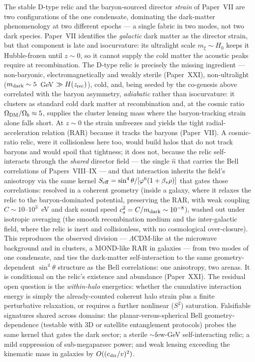 The stable D-type relic and the baryon-sourced director \emph{strain}
of Paper~VII are two configurations of the one condensate, dominating
the dark-matter phenomenology at two different epochs --- a single
fabric in two modes, not two dark species. Paper~VII identifies the
\emph{galactic} dark matter as the director strain, but that component
is late and isocurvature: its ultralight scale $m_\xi\sim H_0$ keeps it
Hubble-frozen until $z\sim0$, so it cannot supply the cold matter the
acoustic peaks require at recombination. The D-type relic is precisely
the missing ingredient --- non-baryonic, electromagnetically and weakly
sterile (Paper~XXI), non-ultralight ($m_{\rm dark}\sim5$~GeV
$\gg H(z_{\rm rec})$), cold, and, being seeded by the co-genesis above
correlated with the baryon asymmetry, \emph{adiabatic} rather than
isocurvature: it clusters as standard cold dark matter at
recombination and, at the cosmic ratio $\Omega_{\mathrm{DM}}/\Omega_{b}\approx5$, supplies the
cluster lensing mass where the baryon-tracking strain alone falls
short. At $z\sim0$ the strain unfreezes and yields the tight
radial-acceleration relation (RAR) because it tracks the baryons
(Paper~VII). A cosmic-ratio relic, were it collisionless here too,
would build halos that do not track baryons and would spoil that
tightness; it does not, because the relic self-interacts through the
\emph{shared} director field --- the single $\hat n$ that carries the
Bell correlations of Papers~VIII--IX --- and that interaction inherits
the field's anisotropy via the same kernel
$S_{\rm eff}=\sin^4\theta/[\varphi^6(1+\beta_*\rho)]$ that gates those
correlations: resolved in a coherent geometry (inside a galaxy, where
it relaxes the relic to the baryon-dominated potential, preserving the
RAR, with weak coupling $C\sim10$--$10^3$~eV and dark sound speed
$c_s^2=C/m_{\rm dark}\sim10^{-8}$), washed out under isotropic averaging
(the smooth recombination medium and the inter-galactic field, where
the relic is inert and collisionless, with no cosmological
over-closure). This reproduces the observed division ---
$\Lambda$CDM-like at the microwave background and in clusters, a
MOND-like RAR in galaxies --- from two modes of one condensate, and
ties the dark-matter self-interaction to the same geometry-dependent
$\sin^4\theta$ structure as the Bell correlations: one anisotropy, two
arenas. It is conditional on the relic's existence and abundance
(Paper~XXI). The residual open question is the \emph{within-halo}
energetics: whether the cumulative interaction energy is simply the
already-counted coherent halo strain plus a finite perturbative
relaxation, or requires a further nonlinear ($S^2$) saturation.
Falsifiable signatures shared across domains: the
planar-versus-spherical Bell geometry-dependence (testable with 3D or
satellite entanglement protocols) probes the same kernel that gates the
dark sector; a sterile $\sim$few-GeV self-interacting relic; a mild
suppression of sub-megaparsec power; and weak lensing exceeding the
kinematic mass in galaxies by $O((c_{\rm dir}/v)^2)$.

